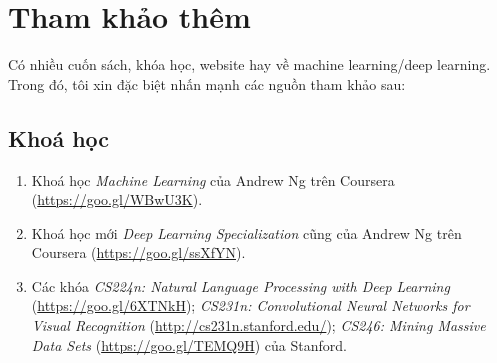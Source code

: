 \section{Tham khảo thêm}

Có nhiều cuốn sách, khóa học, website hay về machine learning/deep learning. Trong đó, tôi xin đặc biệt nhấn mạnh các nguồn tham khảo sau:

\subsection{Khoá học}
\begin{enumerate}
  \item Khoá học \textit{Machine Learning} của Andrew Ng trên Coursera
  (\url{https://goo.gl/WBwU3K}).

  \item Khoá học mới \textit{Deep Learning Specialization} cũng của Andrew Ng
  trên Coursera (\url{https://goo.gl/ssXfYN}).

  \item Các khóa \textit{CS224n: Natural Language Processing with Deep
  Learning} (\url{https://goo.gl/6XTNkH}); \textit{CS231n: Convolutional Neural
  Networks for Visual Recognition} (\url{http://cs231n.stanford.edu/});
  \textit{CS246: Mining Massive Data Sets} (\url{https://goo.gl/TEMQ9H}) của
  Stanford.


\end{enumerate}

